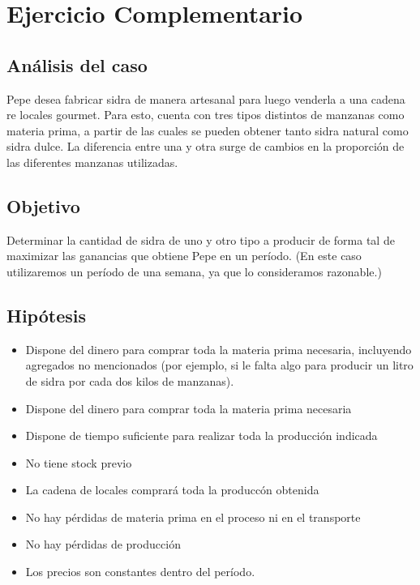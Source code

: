 \documentclass[a4paper,10pt]{article}
\begin{document}
\newpage

\section{Ejercicio Complementario}

\subsection{An\'alisis del caso}

Pepe desea fabricar sidra de manera artesanal para luego venderla a una cadena re locales gourmet. Para esto, cuenta con tres tipos distintos de manzanas como materia prima, a partir de las cuales se pueden obtener tanto sidra natural como sidra dulce. La diferencia entre una y otra surge de cambios en la proporci\'on de las diferentes manzanas utilizadas. 

\subsection{Objetivo}

Determinar la cantidad de sidra de uno y otro tipo a producir de forma tal de maximizar las ganancias que obtiene Pepe en un per\'iodo. (En este caso utilizaremos un per\'iodo de una semana, ya que lo consideramos razonable.)

\subsection{Hip\'otesis}
\begin{itemize}
 \item{Dispone del dinero para comprar toda la materia prima necesaria, incluyendo agregados no mencionados (por ejemplo, si le falta algo para producir un litro de sidra por cada dos kilos de manzanas).}
 \item{Dispone del dinero para comprar toda la materia prima necesaria}
 \item{Dispone de tiempo suficiente para realizar toda la producci\'on indicada}
 \item{No tiene stock previo}
 \item{La cadena de locales comprar\'a toda la producc\'on obtenida}
 \item{No hay p\'erdidas de materia prima en el proceso ni en el transporte}
 \item{No hay p\'erdidas de producci\'on}
 \item{Los precios son constantes dentro del per\'iodo.}
\end{itemize}
 
\end{document}

